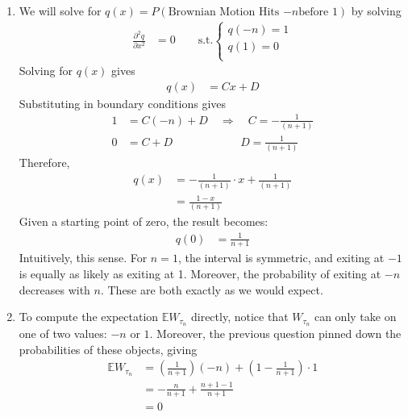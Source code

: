 \documentclass[12pt]{article}
\theoremstyle{plain}
\theoremstyle{definition}
\theoremstyle{remark}
\begin{document}
\begin{enumerate}
\begin{enumerate}
      \item %
        We will solve for $q(x) = P(\text{Brownian Motion Hits $-n$
        before 1})$ by solving
        \begin{align*}
          \frac{\partial^2 q}{\partial x^2}
          &= 0
          \qquad
          \text{s.t.}
          \begin{cases}
            q(-n) = 1 \\
            q(1)  = 0 \\
          \end{cases}
        \end{align*}
        Solving for $q(x)$ gives
        \begin{align*}
          q(x) &= Cx + D
        \end{align*}
        Substituting in boundary conditions gives
        \begin{align*}
          1 &= C(-n) + D
          \quad \Rightarrow \quad
          C = -\frac{1}{(n+1)}\\
          0 &= C + D
          \quad\qquad\qquad\quad
          D = \frac{1}{(n+1)}
        \end{align*}
        Therefore,
        \begin{align*}
          q(x) &= -\frac{1}{(n+1)}\cdot x + \frac{1}{(n+1)}\\
               &= \frac{1-x}{(n+1)}
        \end{align*}
        Given a starting point of zero, the result becomes:
        \begin{align*}
          q(0) &= \frac{1}{n+1}
        \end{align*}
        Intuitively, this sense. For $n=1$, the interval is symmetric,
        and exiting at $-1$ is equally as likely as exiting at 1.
        Moreover, the probability of exiting at $-n$ decreases with $n$.
        These are both exactly as we would expect.

      \item %
        To compute the expectation $\mathbb{E}W_{\tau_n}$ directly,
        notice that $W_{\tau_n}$ can only take on one of two values:
        $-n$ or $1$. Moreover, the previous question pinned down the
        probabilities of these objects, giving
        \begin{align*}
          \mathbb{E}W_{\tau_n}
          &=
          \left(\frac{1}{n+1}\right)(-n)
          + \left(1-\frac{1}{n+1}\right)\cdot 1\\
          &=
          -\frac{n}{n+1}
          + \frac{n+1 - 1}{n+1}\\
          &= 0
        \end{align*}


\end{enumerate}
\end{enumerate}
\end{document}
